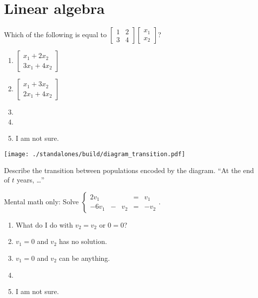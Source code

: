 \documentclass[t, 14pt]{beamer}
\begin{document}
\section{Linear algebra}

\begin{frame}
  Which of the following is equal to \(\begin{bmatrix} 1 & 2 \\ 3 & 4 \end{bmatrix} \begin{bmatrix}x_{1} \\ x_{2}\end{bmatrix}\)?
  \begin{multicols}{2}
    \begin{enumerate}
      \item \(\begin{bmatrix} x_{1} + 2 x_{2} \\ 3x_{1} + 4x_{2} \end{bmatrix}\)
      \item \(\begin{bmatrix} x_{1} + 3 x_{2} \\ 2x_{1} + 4x_{2} \end{bmatrix}\)
      \item 
      \item 
      \item I am not sure.
    \end{enumerate}
  \end{multicols}
\end{frame}


\begin{frame}[c]
  \begin{center}
    \texttt{[image: ./standalones/build/diagram\_transition.pdf]}
  \end{center}

  Describe the transition between populations encoded by the diagram. ``At the end of \(t\) years, \ldots{}''
\end{frame}

\begin{frame}
  Mental math only: Solve \(\left\{\begin{array}{rcrcr}  2 v_{1} && &=& v_{1} \\ -6 v_{1} &-& v_{2} &=& -v_{2} \end{array}\right.\).

  \pause
  \begin{enumerate}
    \item What do I do with \(v_{2} = v_{2}\) or \(0 = 0\)?
    \item \(v_{1} = 0\) and \(v_{2}\) has no solution.
    \item \(v_{1} = 0\) and \(v_{2}\) can be anything.
    \item 
    \item I am not sure. 
  \end{enumerate}
\end{frame}
\end{document}
